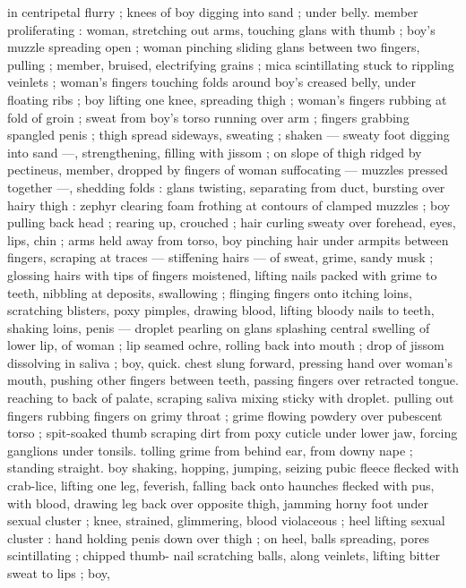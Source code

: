 {in centripetal flurry ; knees of boy digging into sand ; under belly. 
member proliferating : woman, stretching out arms, touching glans 
with thumb ; boy's muzzle spreading open ; woman pinching sliding 
glans between two fingers, pulling ; member, bruised, electrifying 
grains ; mica scintillating stuck to rippling veinlets ; woman's fingers 
touching folds around boy's creased belly, under floating ribs ; boy 
lifting one knee, spreading thigh ; woman's fingers rubbing at fold of 
groin ; sweat from boy's torso running over arm ; fingers grabbing 
spangled penis ; thigh spread sideways, sweating ; shaken --- sweaty 
foot digging into sand ---, strengthening, filling with jissom ; on 
slope of thigh ridged by pectineus, member, dropped by fingers of 
woman suffocating --- muzzles pressed together ---, shedding folds 
: glans twisting, separating from duct, bursting over hairy thigh : 
zephyr clearing foam frothing at contours of clamped muzzles ; boy 
pulling back head ; rearing up, crouched ; hair curling sweaty over 
forehead, eyes, lips, chin ; arms held away from torso, boy pinching 
hair under armpits between fingers, scraping at traces --- stiffening 
hairs --- of sweat, grime, sandy musk ; glossing hairs with tips of 
fingers moistened, lifting nails packed with grime to teeth, nibbling 
at deposits, swallowing ; flinging fingers onto itching loins, 
scratching blisters, poxy pimples, drawing blood, lifting bloody nails 
to teeth, shaking loins, penis --- droplet pearling on glans splashing 
central swelling of lower lip, of woman ; lip seamed ochre, rolling 
back into mouth ; drop of jissom dissolving in saliva ; boy, quick. 
chest slung forward, pressing hand over woman's mouth, pushing 
other fingers between teeth, passing fingers over retracted tongue. 
reaching to back of palate, scraping saliva mixing sticky with droplet. 
pulling out fingers rubbing fingers on grimy throat ; grime flowing 
powdery over pubescent torso ; spit-soaked thumb scraping dirt 
from poxy cuticle under lower jaw, forcing ganglions under tonsils. 
tolling grime from behind ear, from downy nape ; standing straight. 
boy shaking, hopping, jumping, seizing pubic fleece flecked with 
crab-lice, lifting one leg, feverish, falling back onto haunches flecked 
with pus, with blood, drawing leg back over opposite thigh, jamming 
horny foot under sexual cluster ; knee, strained, glimmering, blood 
violaceous ; heel lifting sexual cluster : hand holding penis down over 
thigh ; on heel, balls spreading, pores scintillating ; chipped thumb- 
nail scratching balls, along veinlets, lifting bitter sweat to lips ; boy, 
}
